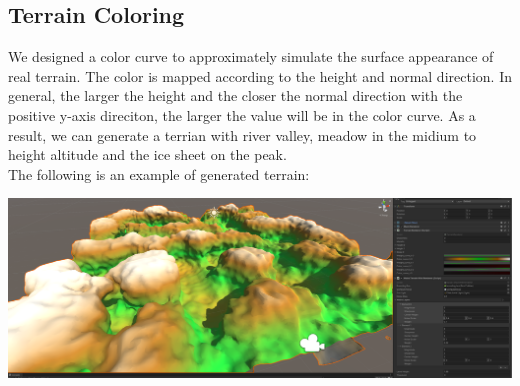 \documentclass[acmtog]{acmart}
\begin{document}
\subsection{Terrain Coloring}
We designed a color curve to approximately simulate the surface appearance of real terrain.
The color is mapped according to the height and normal direction.
In general, the larger the height and the closer the normal direction with the positive y-axis direciton,
the larger the value will be in the color curve. As a result, we can generate a terrian with river valley,
meadow in the midium to height altitude and the ice sheet on the peak.\\
The following is an example of generated terrain:\\
\begin{center}
    \includegraphics[width=0.9\linewidth]{../Images/NoiseTerrain.PNG}
\end{center}
\end{document}
